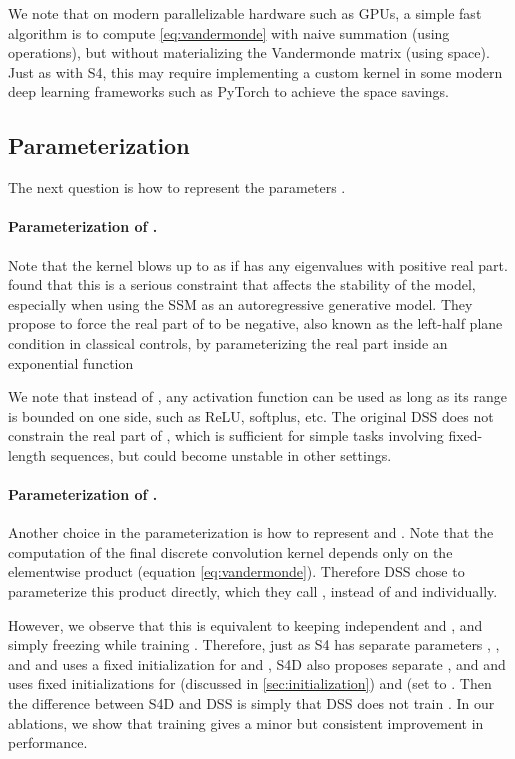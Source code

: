 \documentclass{article}
\newcommand{\para}[1]{\paragraph{#1}}
\begin{document}
We note that on modern parallelizable hardware such as GPUs, a simple fast algorithm is to compute \eqref{eq:vandermonde} with naive summation (using  operations),
but without materializing the Vandermonde matrix (using  space).
Just as with S4, this may require implementing a custom kernel in some modern deep learning frameworks such as PyTorch to achieve the space savings.


\subsection{Parameterization}
\label{sec:method:param}

The next question is how to represent the parameters .

\para{Parameterization of .}
Note that the kernel  blows up to  as  if  has any eigenvalues with positive real part.
\citet{goel2022sashimi} found that this is a serious constraint that affects the stability of the model, especially when using the SSM as an autoregressive generative model.
They propose to force the real part of  to be negative,
also known as the left-half plane condition in classical controls,
by parameterizing the real part inside an exponential function


We note that instead of , any activation function can be used as long as its range is bounded on one side, such as ReLU, softplus, etc. The original DSS does not constrain the real part of ,
which is sufficient for simple tasks involving fixed-length sequences,
but could become unstable in other settings.


\para{Parameterization of .}
Another choice in the parameterization is how to represent  and .
Note that the computation of the final discrete convolution kernel  depends only on the elementwise product  (equation \eqref{eq:vandermonde}).
Therefore DSS chose to parameterize this product directly, which they call , instead of  and  individually.

However, we observe that this is equivalent to keeping independent  and , and simply freezing  while training .
Therefore, just as S4 has separate parameters , , and  and uses a fixed initialization for  and ,
S4D also proposes separate , and  and uses fixed initializations for  (discussed in \cref{sec:initialization}) and  (set to .
Then the difference between S4D and DSS is simply that DSS does not train .
In our ablations, we show that training  gives a minor but consistent improvement in performance.
\end{document}
